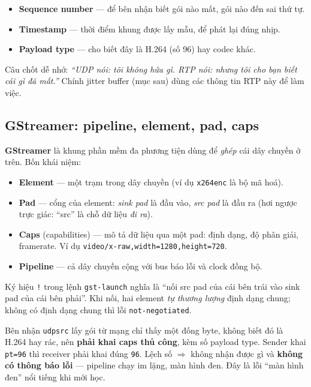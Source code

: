 \documentclass[12pt]{ai_conquer2026}
\begin{document}
\begin{itemize}
\item \textbf{Sequence number} --- để bên nhận biết gói nào mất, gói nào đến sai
      thứ tự.
\item \textbf{Timestamp} --- thời điểm khung được lấy mẫu, để phát lại đúng nhịp.
\item \textbf{Payload type} --- cho biết đây là H.264 (số 96) hay codec khác.
\end{itemize}

Câu chốt dễ nhớ: \emph{``UDP nói: tôi không hứa gì. RTP nói: nhưng tôi cho bạn
biết cái gì đã mất.''} Chính jitter buffer (mục sau) dùng các thông tin RTP này
để làm việc.

\subsection{GStreamer: pipeline, element, pad, caps}

\textbf{GStreamer} là khung phần mềm đa phương tiện dùng để \emph{ghép} cái dây
chuyền ở trên. Bốn khái niệm:

\begin{itemize}
\item \textbf{Element} --- một trạm trong dây chuyền (ví dụ \texttt{x264enc} là
      bộ mã hoá).
\item \textbf{Pad} --- cổng của element: \emph{sink pad} là đầu vào, \emph{src
      pad} là đầu ra (hơi ngược trực giác: ``src'' là chỗ dữ liệu \emph{đi ra}).
\item \textbf{Caps} (capabilities) --- mô tả dữ liệu qua một pad: định dạng, độ
      phân giải, framerate. Ví dụ \texttt{video/x-raw,width=1280,height=720}.
\item \textbf{Pipeline} --- cả dây chuyền cộng với bus báo lỗi và clock đồng bộ.
\end{itemize}

Ký hiệu \texttt{!} trong lệnh \texttt{gst-launch} nghĩa là ``nối src pad của cái
bên trái vào sink pad của cái bên phải''. Khi nối, hai element \emph{tự thương
lượng} định dạng chung; không có định dạng chung thì lỗi \texttt{not-negotiated}.

\begin{aivncodebox}
Bên nhận \texttt{udpsrc} lấy gói từ mạng chỉ thấy một đống byte, không biết đó là
H.264 hay rác, nên \textbf{phải khai caps thủ công}, kèm số payload type. Sender
khai \texttt{pt=96} thì receiver phải khai đúng \texttt{96}. Lệch số $\Rightarrow$
không nhận được gì và \textbf{không có thông báo lỗi} --- pipeline chạy im lặng,
màn hình đen. Đây là lỗi ``màn hình đen'' nổi tiếng khi mới học.
\end{aivncodebox}
\end{document}
